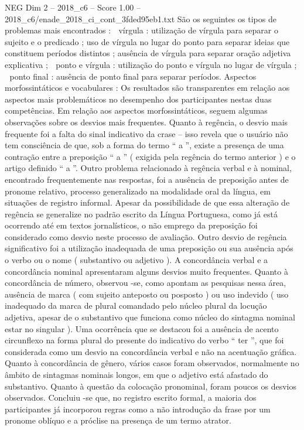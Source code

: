 \begin{textsample}{NEG Dim 2 – 2018\_c6 – Score 1.00 – 2018\_c6/enade\_2018\_ci\_cont\_3fded95eb1.txt}
São os seguintes os tipos de problemas mais encontrados :  vírgula : utilização de vírgula para separar o sujeito e o predicado ; uso de vírgula no lugar do ponto para separar ideias que constituem períodos distintos ; ausência de vírgula para separar oração adjetiva explicativa ;  ponto e vírgula : utilização do ponto e vírgula no lugar de vírgula ;  ponto final : ausência de ponto final para separar períodos.
Aspectos morfossintáticos e vocabulares : Os resultados são transparentes em relação aos aspectos mais problemáticos no desempenho dos participantes nestas duas competências.
Em relação aos aspectos morfossintáticos, seguem algumas observações sobre os desvios mais frequentes.
Quanto à regência, o desvio mais frequente foi a falta do sinal indicativo da crase – isso revela que o usuário não tem consciência de que, sob a forma do termo “ a ”, existe a presença de uma contração entre a preposição “ a ” ( exigida pela regência do termo anterior ) e o artigo definido “ a ”.
Outro problema relacionado à regência verbal e à nominal, encontrado frequentemente nas respostas, foi a ausência de preposição antes de pronome relativo, processo generalizado na modalidade oral da língua, em situações de registro informal.
Apesar da possibilidade de que essa alteração de regência se generalize no padrão escrito da Língua Portuguesa, como já está ocorrendo até em textos jornalísticos, o não emprego da preposição foi considerado como desvio neste processo de avaliação.
Outro desvio de regência significativo foi a utilização inadequada de uma preposição ou sua ausência após o verbo ou o nome ( substantivo ou adjetivo ).
A concordância verbal e a concordância nominal apresentaram alguns desvios muito frequentes.
Quanto à concordância de número, observou -se, como apontam as pesquisas nessa área, ausência de marca ( com sujeito anteposto ou posposto ) ou uso indevido ( uso inadequado da marca de plural comandado pelo núcleo plural da locução adjetiva, apesar de o substantivo que funciona como núcleo do sintagma nominal estar no singular ).
Uma ocorrência que se destacou foi a ausência de acento circunflexo na forma plural do presente do indicativo do verbo “ ter ”, que foi considerada como um desvio na concordância verbal e não na acentuação gráfica.
Quanto à concordância de gênero, vários casos foram observados, normalmente no âmbito de sintagmas nominais longos, em que o adjetivo está afastado do substantivo.
Quanto à questão da colocação pronominal, foram poucos os desvios observados.
Concluiu -se que, no registro escrito formal, a maioria dos participantes já incorporou regras como a não introdução da frase por um pronome oblíquo e a próclise na presença de um termo atrator.

\end{textsample}
